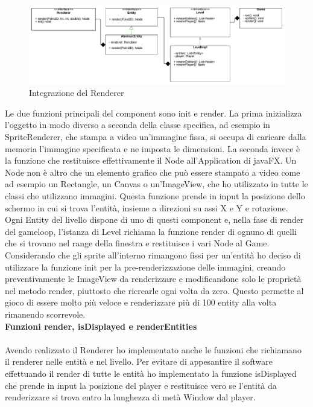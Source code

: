\documentclass[a4paper,12pt]{report}
\begin{document}
\begin{figure}[ht]
\includegraphics[width=1\textwidth]{images/renderer.png}
\caption{Integrazione del Renderer}
\label{fig:renderer}
\end{figure}

Le due funzioni principali del component sono init e render.
La prima inizializza l'oggetto in modo diverso a seconda della classe specifica, ad esempio in SpriteRenderer, che stampa a video un'immagine fissa, si occupa di caricare dalla memoria l'immagine specificata e ne imposta le dimensioni.
La seconda invece è la funzione che restituisce effettivamente il Node all'Application di javaFX. Un Node non è altro che un elemento grafico che può essere stampato a video come ad esempio un Rectangle, un Canvas o un'ImageView, che ho utilizzato in tutte le classi che utilizzano immagini. Questa funzione prende in input la posizione dello schermo in cui si trova l'entità, insieme a direzioni su assi X e Y e rotazione.\\

Ogni Entity del livello dispone di uno di questi component e, nella fase di render del gameloop, l'istanza di Level richiama la funzione render di ognuno di quelli che si trovano nel range della finestra e restituisce i vari Node al Game.\\

Considerando che gli sprite all'interno rimangono fissi per un'entità ho deciso di utilizzare la funzione init per la pre-renderizzazione delle immagini, creando preventivamente le ImageView da renderizzare e modificandone solo le proprietà nel metodo render, piuttosto che ricrearle ogni volta da zero. Questo permette al gioco di essere molto più veloce e renderizzare più di 100 entity alla volta rimanendo scorrevole.\\

\textbf{Funzioni render, isDisplayed e renderEntities}\\
\\
Avendo realizzato il Renderer ho implementato anche le funzioni che richiamano il renderer nelle entità e nel livello.
Per evitare di appesantire il software effettuando il render di tutte le entità ho implementato la funzione isDisplayed che prende in input la posizione del player e restituisce vero se l'entità da renderizzare si trova entro la lunghezza di metà Window dal player.\\
\end{document}
